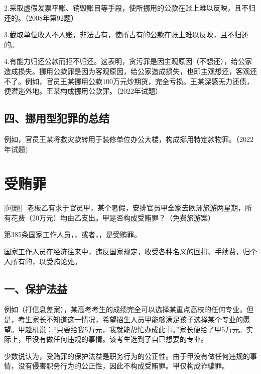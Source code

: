 2.采取虚假发票平账、销毁账目等手段，使所挪用的公款在账上难以反映，且不归还的。（2008年第92题）

3.截取单位收入不人账，非法占有，使所占有的公款在账上难以反映，且不归还的。

4.有能力归还公款而拒不归还。这表明，贪污罪是因主观原因（不想还），给公家造成损失。挪用公款罪是因为客观原因，给公家造成损失，也即主观想还，客观还不了。例如，官员王某挪用公款100万元炒期货，完全亏损。王某深感无力还债，便潜逃外地。王某构成挪用公款罪。（2022年试题）

\subsection*{四、挪用型犯罪的总结}


例如，官员王某将救灾款转用于装修单位办公大楼，构成挪用特定款物罪。（2022年试题)

\section{受贿罪}

[问题］老板乙有求于官员甲，某个暑假，安排官员甲全家去欧洲旅游两星期，所有花费（20万元）均由乙支出。甲是否构成受贿罪？（免费旅游案）

第385条国家工作人员，，或者，，是受贿罪。

国家工作人员在经济往来中，违反国家规定，收受各种名义的回扣、手续费，归个人所有的，以受贿论处。

\subsection*{一、保护法益}

例如（打信息差案），某高考考生的成绩完全可以选择某重点高校的任何专业。但是，考生家长不知道这一情况，希望招生人员甲能够满足孩子选择某个专业的愿望。甲趁机说：“只要给我5万元，我就能帮忙办成此事。”家长便给了甲5万元。实际上，甲没有做任何违规的事情。该考生选到了自已想要的专业。

少数说认为，受贿罪的保护法益是职务行为的公正性。由于甲没有做任何违规的事情，没有侵害职务行为的公正性，因此不构成受贿罪。甲仅构成诈骗罪。


